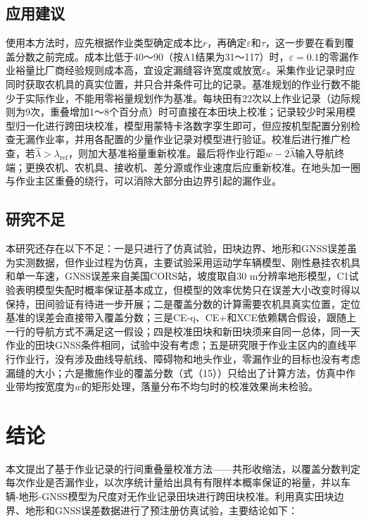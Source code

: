 \documentclass[preprint,12pt,number,sort&compress]{elsarticle}
\begin{document}
\subsection{应用建议}

使用本方法时，应先根据作业类型确定成本比\(r\)，再确定\(\varepsilon\)和\(\tau\)，这一步要在看到覆盖分数之前完成。成本比低于40～90（按A1结果为31～117）时，\(\varepsilon=0.1\)的零漏作业裕量比厂商经验规则成本高，宜设定漏缝容许宽度或放宽\(\varepsilon\)。采集作业记录时应同时获取农机具的真实位置，并只合并条件可比的记录。基准规划的作业行数不能少于实际作业，不能用零裕量规划作为基准。每块田有22次以上作业记录（边际规则为9次，重叠增加1～8个百分点）时可直接在本田块上校准；记录较少时采用模型归一化进行跨田块校准，模型用蒙特卡洛数字孪生即可，但应按机型配置分别检查无漏作业率，并用各配置的少量作业记录对模型进行验证。校准后进行推广检查，若\(\hat\lambda>\lambda_\mathrm{ref}\)，则加大基准裕量重新校准。最后将作业行距\(w-2\hat\lambda\)输入导航终端；更换农机、农机具、接收机、差分源或作业速度后应重新校准。在地头加一圈与作业主区重叠的绕行，可以消除大部分由边界引起的漏作业。

\subsection{研究不足}

本研究还存在以下不足：一是只进行了仿真试验，田块边界、地形和GNSS误差虽为实测数据，但作业过程为仿真，主要试验采用运动学车辆模型、刚性悬挂农机具和单一车速，GNSS误差来自美国CORS站，坡度取自30 m分辨率地形模型，C1试验表明模型失配时概率保证基本成立，但模型的效率优势只在误差大小改变时得以保持，田间验证有待进一步开展；二是覆盖分数的计算需要农机具真实位置，定位基准的误差会直接带入覆盖分数；三是CE-q、CE+和XCE依赖耦合假设，跟随上一行的导航方式不满足这一假设；四是校准田块和新田块须来自同一总体，同一天作业的田块GNSS条件相同，试验中没有考虑；五是研究限于作业主区内的直线平行作业行，没有涉及曲线导航线、障碍物和地头作业，零漏作业的目标也没有考虑漏缝的大小；六是撒施作业的覆盖分数（式（15））只给出了计算方法，仿真中作业带均按宽度为\(w\)的矩形处理，落量分布不均匀时的校准效果尚未检验。

\section{结论}

本文提出了基于作业记录的行间重叠量校准方法------共形收缩法，以覆盖分数判定每次作业是否漏作业，以次序统计量给出具有有限样本概率保证的裕量，并以车辆-地形-GNSS模型为尺度对无作业记录田块进行跨田块校准。利用真实田块边界、地形和GNSS误差数据进行了预注册仿真试验，主要结论如下：
\end{document}
